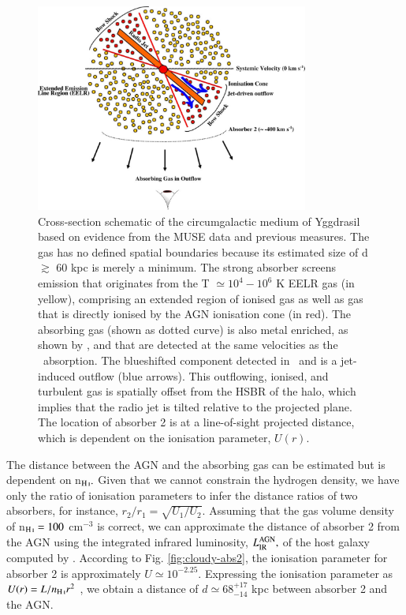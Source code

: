 \begin{figure} 
\centering
\includegraphics[width=0.8\textwidth]{plots_chp3/0943_absorption_schematic8.pdf}
\caption[Cross-section schematic of the circumgalactic medium of MRC 0943-242]{Cross-section schematic of the circumgalactic medium of Yggdrasil based on evidence from the MUSE data and previous measures. The gas has no defined spatial boundaries because its estimated size of d $\gtrsim$ 60 kpc is merely a minimum. The strong absorber screens emission that originates from the T $\simeq10^4-10^6$ K EELR gas (in yellow), comprising an extended region of ionised gas as well as gas that is directly ionised by the AGN ionisation cone (in red). The absorbing gas (shown as dotted curve) is also metal enriched, as shown by ,  and  that are detected at the same velocities as the \lya~absorption. The blueshifted component detected in \lya~and  is a jet-induced outflow (blue arrows). This outflowing, ionised, and turbulent gas is spatially offset from the HSBR of the halo, which implies that the radio jet is tilted relative to the projected plane. The location of absorber 2 is at a line-of-sight projected distance, which is dependent on the ionisation parameter, $U(r).$}
\label{fig:absorption-cartoon}
\end{figure}

The distance between the AGN and the absorbing gas can be estimated but is dependent on n$_{\ion{H}{I}}.$ Given that we cannot constrain the hydrogen density, we have only the ratio of ionisation parameters to infer the distance ratios of two absorbers, for instance, $r_2 / r_1 = \sqrt{U_1 / U_2}.$ Assuming that the  gas volume density of n$_\ion{H}{I} = 100$ cm$^{-3}$ is correct, we can approximate the distance of absorber 2 from the AGN using the integrated infrared luminosity, $L_{\rm IR}^{\rm AGN},$ of the host galaxy computed by \citet{falkendal2019}. According to Fig. \ref{fig:cloudy-abs2}, the ionisation parameter for absorber 2 is approximately $U \simeq 10^{-2.25}.$ Expressing the ionisation parameter as $U(r) = L/n_\ion{H}{I}r^2$ \citep[e.g.][]{rozanska2014}, we obtain a distance of $d \simeq 68^{+17}_{-14}$ kpc between absorber 2 and the AGN.

